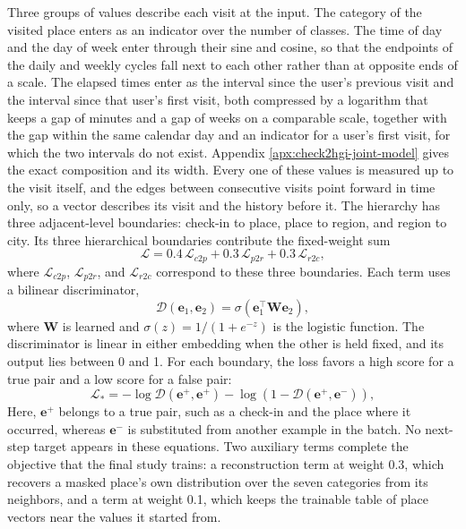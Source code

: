Three groups of values describe each visit at the input. The category of the visited place enters as
an indicator over the number of classes. The time of day and the day of week enter through their sine and
cosine, so that the endpoints of the daily and weekly cycles fall next to each other rather than at
opposite ends of a scale. The elapsed times enter as the interval since the user's previous visit and
the interval since that user's first visit, both compressed by a logarithm that keeps a gap of
minutes and a gap of weeks on a comparable scale, together with the gap within the same calendar day
and an indicator for a user's first visit, for which the two intervals do not exist. Appendix
\ref{apx:check2hgi-joint-model} gives the exact composition and its width. Every one of these values
is measured up to the visit itself, and the edges between consecutive visits point forward in time
only, so a vector describes its visit and the history before it. The hierarchy has
three adjacent-level boundaries: check-in to place, place to region, and region to
city. Its three hierarchical boundaries contribute the fixed-weight sum
\begin{equation}\label{eq:fund:check2hgi}
    \mathcal{L} = 0.4\,\mathcal{L}_{c2p} + 0.3\,\mathcal{L}_{p2r} + 0.3\,\mathcal{L}_{r2c},
\end{equation}
where $\mathcal{L}_{c2p}$, $\mathcal{L}_{p2r}$, and $\mathcal{L}_{r2c}$ correspond
to these three boundaries. Each term uses a bilinear discriminator,
\begin{equation}\label{eq:fund:check2hgi-disc}
    \mathcal{D}(\mathbf{e}_1, \mathbf{e}_2) = \sigma(\mathbf{e}_1^{\top}\mathbf{W}\mathbf{e}_2),
\end{equation}
where $\mathbf{W}$ is learned and
$\sigma(z)=1/(1+e^{-z})$ is the logistic function. The discriminator is linear in
either embedding when the other is held fixed, and its output lies between 0 and 1.
For each boundary, the loss favors a high score for a true pair and a low score for a
false pair:
\begin{equation}\label{eq:fund:check2hgi-term}
    \mathcal{L}_{*} = -\log \mathcal{D}(\mathbf{e}^{+}, \mathbf{e}^{+})
    - \log\left(1 - \mathcal{D}(\mathbf{e}^{+}, \mathbf{e}^{-})\right),
\end{equation}
Here, $\mathbf{e}^{+}$ belongs to a true pair, such as a check-in and the place where
it occurred, whereas $\mathbf{e}^{-}$ is substituted from another example in the
batch. No next-step target appears in these equations. Two auxiliary terms complete the
objective that the final study trains: a reconstruction term at weight 0.3, which
recovers a masked place's own distribution over the seven categories from its
neighbors, and a term at weight 0.1, which keeps the trainable table of place vectors
near the values it started from.


